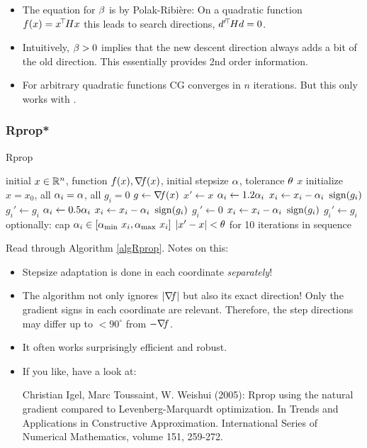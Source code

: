 \begin{itemize}
\item The equation for $\beta$ is by Polak-Ribi{\`e}re: On a quadratic
function $f(x) = x^{\!\top\!} H x$ this leads to  search
   directions, $d'^{\!\top\!} H d = 0$.

\item Intuitively, $\beta>0$ implies that the new descent direction always adds a bit of the old
   direction. This essentially provides 2nd order information.

\item For arbitrary quadratic functions CG converges in $n$ iterations. But
 this only works with .
\end{itemize}


\subsubsection{Rprop*}

\begin{algorithm}[t]\caption{Rprop}\label{algRprop}
\begin{algorithmic}[1]
\Require initial $x\in{\mathbb{R}}^n$, function $f(x), {\nabla_{\!\!}} f(x)$, initial stepsize $\alpha$, tolerance $\theta$
\Ensure $x$
\State initialize $x=x_0$, all $\alpha_i=\alpha$, all $g_i=0$
\Repeat
\State $g \gets {\nabla_{\!\!}} f(x)$
\State $x' \gets x$
 
\State $\alpha_i \gets 1.2 \alpha_i$
\State $x_i \gets x_i - \alpha_i~ \operatorname{sign}(g_i)$
\State $g_i' \gets g_i$
 
\State $\alpha_i \gets 0.5 \alpha_i$
\State $x_i \gets x_i - \alpha_i~ \operatorname{sign}(g_i)$
\State $g_i' \gets 0$ 
\Else
\State $x_i \gets x_i - \alpha_i~ \operatorname{sign}(g_i)$
\State $g_i' \gets g_i$
\EndIf
\State optionally: cap $\alpha_i \in [\alpha_{\text{min}}~ x_i, \alpha_{\text{max}}~ x_i]$
\EndFor
\Until $|x'-x| <\theta$ for 10 iterations in sequence
\end{algorithmic}
\end{algorithm}

Read through Algorithm \ref{algRprop}. Notes on this:
\begin{itemize}
\item Stepsize adaptation is done in each coordinate \emph{separately}!
\item The algorithm not only ignores $|{\nabla_{\!\!}} f|$ but also its exact
direction! Only the gradient signs in each coordinate are
relevant. Therefore, the step directions may differ up to $<90^\circ$ from $-{\nabla_{\!\!}} f$.
\item It often works surprisingly efficient and robust.
\item If you like, have a look at:

{\small

Christian Igel, Marc Toussaint, W. Weishui (2005): Rprop using the
natural gradient compared to Levenberg-Marquardt optimization. In
Trends and Applications in Constructive Approximation. International
Series of Numerical Mathematics, volume 151, 259-272.

}
\end{itemize}


